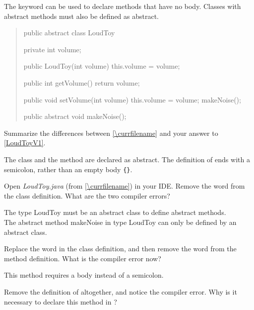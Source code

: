 
The  keyword can be used to declare methods that have no body.
Classes with abstract methods must also be defined as abstract.

\begin{quote}
\begin{javalst}
public abstract class LoudToy {
    private int volume;

    public LoudToy(int volume) {
        this.volume = volume;
    }

    public int getVolume() {
        return volume;
    }

    public void setVolume(int volume) {
        this.volume = volume;
        makeNoise();
    }

    public abstract void makeNoise();
}
\end{javalst}
\end{quote}




\Q Summarize the differences between \ref{\currfilename} and your answer to \ref{LoudToyV1}.

\begin{answer}
The class and the  method are declared as abstract.
The definition of  ends with a semicolon, rather than an empty body \verb|{}|.
\end{answer}


\Q Open \textit{LoudToy.java} (from \ref{\currfilename}) in your IDE.
Remove the word  from the class definition.
What are the two compiler errors?

\begin{answer}
The type LoudToy must be an abstract class to define abstract methods. \\[1ex]
The abstract method makeNoise in type LoudToy can only be defined by an abstract class.
\end{answer}


\Q Replace the word  in the class definition, and then remove the word  from the method definition.
What is the compiler error now?

\begin{answer}
This method requires a body instead of a semicolon.
\end{answer}


\Q Remove the definition of  altogether, and notice the compiler error.
Why is it necessary to declare this method in ?

